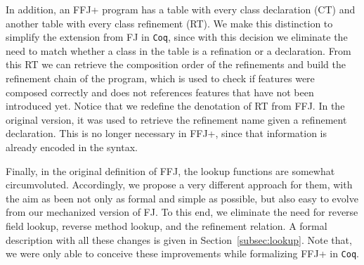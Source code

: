 In addition, an \gls{FFJ+} program has a table with every class 
declaration (\textsf{CT}) and another table with every class refinement (\textsf{RT}).
We make this distinction to simplify the extension from \gls{FJ} in \texttt{Coq}, since 
with this decision we eliminate the need to match whether a class in the table 
is a refination or a declaration. From this \textsf{RT} we can retrieve the composition order
of the refinements and build the refinement chain of the program, 
which is used to check if features were composed correctly and
does not references features that have not been introduced yet. 
Notice that we redefine the denotation of \textsf{RT} from \gls{FFJ}.
In the original version, it was used to retrieve the refinement name given a 
refinement declaration. This is no longer necessary in \gls{FFJ+}, since
that information is already encoded in the syntax.

Finally, in the original definition of \gls{FFJ}, the lookup functions are 
somewhat circumvoluted. Accordingly, we propose a very different approach
for them, with the aim as been not only as formal and simple as possible, 
but also easy to evolve from our mechanized version of \gls{FJ}. 
To this end, we eliminate the need for reverse field lookup, reverse method lookup, 
and the refinement relation. A formal description with all these changes 
is given in Section~\ref{subsec:lookup}. Note that, we were only 
able to conceive these improvements while formalizing \gls{FFJ+} in 
\texttt{Coq}. 


